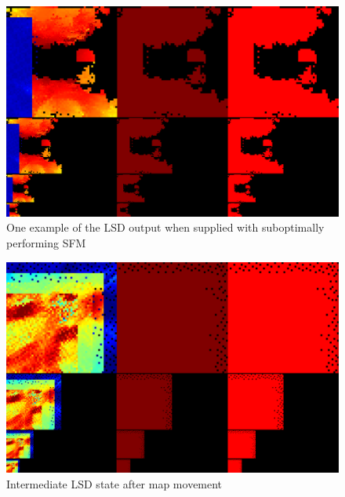\begin{figure}[h]
    \centering
    \includegraphics[scale=0.25]{images/evaluation/SFM_issues/issue1.png}
    \caption{One example of the LSD output when supplied with suboptimally performing SFM}
    \label{fig:SFM_issue_1}
\end{figure} 

\begin{figure}[h]
    \centering
    \includegraphics[scale=0.25]{images/evaluation/SFM_issues/issue2.png}
    \caption{Intermediate LSD state after map movement}
    \label{fig:SFM_movement1}
\end{figure}

